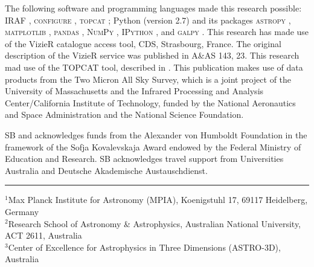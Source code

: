 \documentclass[fleqn,usenatbib,useAMS]{mnras}
\begin{document}
The following software and programming languages made this research possible: \textsc{IRAF} \citep{Tody1986,Tody1993}, \textsc{configure} \citep{Miszalski2006}, \textsc{topcat} \citep[version 4.4;][]{Taylor2005}; Python (version 2.7) and its packages {\textsc{astropy}} \citep[version 2.0;][]{Robitaille2013,PriceWhelan2018}, {\textsc{matplotlib}} \citep{matplotlib}, {\textsc{pandas}} \citep[version 0.20.2;][]{McKinney2011}, {\textsc{NumPy}} \citep{numpy}, {\textsc{IPython}} \citep{ipython}, and  \textsc{galpy} \citep[version 1.3;][]{Bovy2015}. This research has made use of the VizieR catalogue access tool, CDS, Strasbourg, France. The original description of the VizieR service was published in A\&AS 143, 23. This research mad use of the TOPCAT tool, described in \citet{Taylor2005}. This publication makes use of data products from the Two Micron All Sky Survey, which is a joint project of the University of Massachusetts and the Infrared Processing and Analysis Center/California Institute of Technology, funded by the National Aeronautics and Space Administration and the National Science Foundation.

SB and acknowledges funds from the Alexander von Humboldt Foundation in the framework of the Sofja Kovalevskaja Award endowed by the Federal Ministry of Education and Research. SB acknowledges travel support from Universities Australia and Deutsche Akademische Austauschdienst.







\newpage
\noindent \rule{8.5cm}{1pt}

\noindent
$^{1}$Max Planck Institute  for Astronomy (MPIA), Koenigstuhl 17, 69117 Heidelberg, Germany\\
$^{2}$Research School of Astronomy \& Astrophysics, Australian National University, ACT 2611, Australia\\
$^{3}$Center of Excellence for Astrophysics in Three Dimensions (ASTRO-3D), Australia\\

\end{document}
